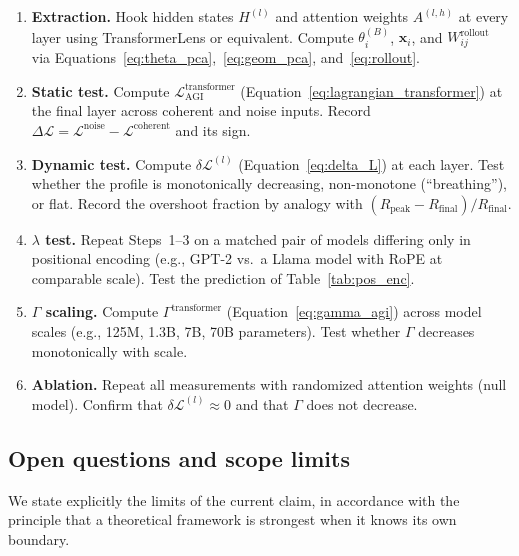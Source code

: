 \documentclass[12pt,a4paper]{article}
\theoremstyle{plain}
\theoremstyle{definition}
\begin{document}
\begin{enumerate}[label=\textbf{Step~\arabic*.}, leftmargin=*, itemsep=4pt]

  \item \textbf{Extraction.} Hook hidden states $H^{(l)}$ and attention
  weights $A^{(l,h)}$ at every layer using TransformerLens or equivalent.
  Compute $\theta_i^{(B)}$, $\mathbf{x}_i$, and $W_{ij}^{\text{rollout}}$
  via Equations~\eqref{eq:theta_pca},~\eqref{eq:geom_pca},
  and~\eqref{eq:rollout}.

  \item \textbf{Static test.} Compute
  $\mathcal{L}_{\text{AGI}}^{\text{transformer}}$
  (Equation~\ref{eq:lagrangian_transformer}) at the final layer across
  coherent and noise inputs. Record
  $\Delta\mathcal{L} = \mathcal{L}^{\text{noise}} -
  \mathcal{L}^{\text{coherent}}$ and its sign.

  \item \textbf{Dynamic test.} Compute $\delta\mathcal{L}^{(l)}$
  (Equation~\ref{eq:delta_L}) at each layer. Test whether the profile is
  monotonically decreasing, non-monotone (``breathing''), or flat. Record
  the overshoot fraction by analogy with
  $(R_{\text{peak}} - R_{\text{final}})/R_{\text{final}}$.

  \item \textbf{$\lambda$ test.} Repeat Steps~1--3 on a matched pair of
  models differing only in positional encoding (e.g., GPT-2 vs.\ a
  Llama model with RoPE at comparable scale). Test the prediction of
  Table~\ref{tab:pos_enc}.

  \item \textbf{$\Gamma$ scaling.} Compute
  $\Gamma^{\text{transformer}}$ (Equation~\ref{eq:gamma_agi}) across
  model scales (e.g., 125M, 1.3B, 7B, 70B parameters). Test whether
  $\Gamma$ decreases monotonically with scale.

  \item \textbf{Ablation.} Repeat all measurements with randomized
  attention weights (null model). Confirm that
  $\delta\mathcal{L}^{(l)} \approx 0$ and that $\Gamma$ does not
  decrease.

\end{enumerate}

\subsection{Open questions and scope limits}
\label{subsec:open_agi}

We state explicitly the limits of the current claim, in accordance with
the principle that a theoretical framework is strongest when it knows its
own boundary.
\end{document}
